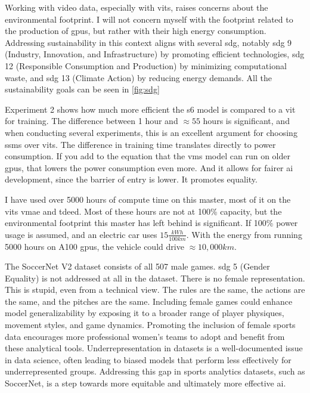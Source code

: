 Working with video data, especially with \acrshort{vit}s, raises concerns about the environmental footprint. I will not concern myself with the footprint related to the production of \acrshort{gpu}s, but rather with their high energy consumption. Addressing sustainability in this context aligns with several \acrfull{sdg}, notably \acrshort{sdg} 9 (Industry, Innovation, and Infrastructure) by promoting efficient technologies, \acrshort{sdg} 12 (Responsible Consumption and Production) by minimizing computational waste, and \acrshort{sdg} 13 (Climate Action) by reducing energy demands. All the sustainability goals can be seen in \cref{fig:sdg}

Experiment 2 shows how much more efficient the \acrshort{s6} model is compared to a \acrshort{vit} for training. The difference between 1 hour and $\approx55$ hours is significant, and when conducting several experiments, this is an excellent argument for choosing \acrshort{ssm}s over \acrshort{vit}s. The difference in training time translates directly to power consumption. If you add to the equation that the \acrshort{vms} model can run on older \acrshort{gpu}s, that lowers the power consumption even more. And it allows for fairer \acrfull{ai} development, since the barrier of entry is lower. It promotes equality. 


I have used over 5000 hours of compute time on this master, most of it on the \acrlong{vit}s \acrshort{vmae} and \acrshort{tdeed}. Most of these hours are not at 100\% capacity, but the environmental footprint this master has left behind is significant. If 100\% power usage is assumed, and an electric car uses $15\frac{kWh}{100km}$. With the energy from running 5000 hours on A100 \acrshort{gpu}s, the vehicle could drive $\approx10,000 km$. 


The SoccerNet V2 dataset consists of all 507 male games. \acrshort{sdg} 5 (Gender Equality) is not addressed at all in the dataset. There is no female representation. This is stupid, even from a technical view. The rules are the same, the actions are the same, and the pitches are the same. Including female games could enhance model generalizability by exposing it to a broader range of player physiques, movement styles, and game dynamics. Promoting the inclusion of female sports data encourages more professional women's teams to adopt and benefit from these analytical tools. Underrepresentation in datasets is a well-documented issue in data science, often leading to biased models that perform less effectively for underrepresented groups. Addressing this gap in sports analytics datasets, such as SoccerNet, is a step towards more equitable and ultimately more effective \acrshort{ai}.